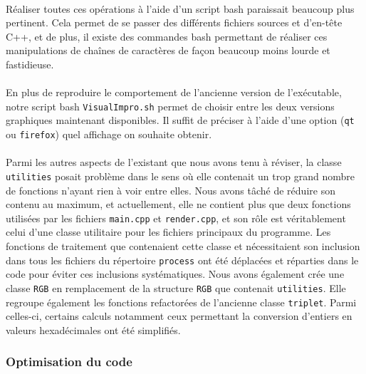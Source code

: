 \paragraph{}
Réaliser toutes ces opérations à l'aide d'un script bash paraissait
beaucoup plus pertinent. Cela permet de se passer des différents
fichiers sources et d'en-tête C++, et de plus, il existe des commandes
bash permettant de réaliser ces manipulations de chaînes de caractères
de façon beaucoup moins lourde et fastidieuse.
\paragraph{}
En plus de reproduire le comportement de l'ancienne version de
l'exécutable, notre script bash \verb!VisualImpro.sh! permet de
choisir entre les deux versions graphiques maintenant disponibles. Il
suffit de préciser à l'aide d'une option (\verb!qt! ou \verb!firefox!)
quel affichage on souhaite obtenir.
\paragraph{}
Parmi les autres aspects de l'existant que nous avons tenu à réviser,
la classe \verb!utilities! posait problème dans le sens où elle
contenait un trop grand nombre de fonctions n'ayant rien à voir entre
elles. Nous avons tâché de réduire son contenu au maximum, et
actuellement, elle ne contient plus que deux fonctions utilisées par
les fichiers \verb!main.cpp! et \verb!render.cpp!, et son rôle est
véritablement celui d'une classe utilitaire pour les fichiers
principaux du programme. Les fonctions de traitement que contenaient
cette classe et nécessitaient son inclusion dans tous les fichiers du
répertoire \verb!process! ont été déplacées et réparties dans le code
pour éviter ces inclusions systématiques. Nous avons également crée
une classe \verb!RGB! en remplacement de la structure \verb!RGB! que
contenait \verb!utilities!. Elle regroupe également les fonctions
refactorées de l'ancienne classe \verb!triplet!. Parmi celles-ci,
certains calculs notamment ceux permettant la conversion d'entiers en
valeurs hexadécimales ont été simplifiés.
\paragraph{}

\subsubsection{Optimisation du code}
